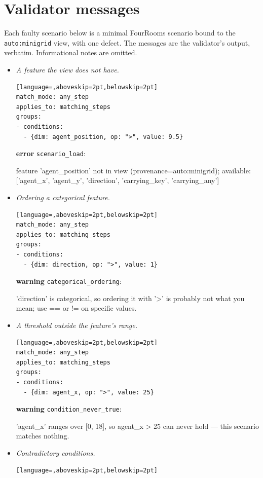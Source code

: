 \section{Validator messages}
\label{app:validator}

Each faulty scenario below is a minimal FourRooms scenario bound to the \texttt{auto:minigrid} view, with one defect. The messages are the validator's output, verbatim. Informational notes are omitted.

\begin{itemize}\setlength{\itemsep}{3pt}
\item \emph{A feature the view does not have.}
\begin{lstlisting}[language=,aboveskip=2pt,belowskip=2pt]
match_mode: any_step
applies_to: matching_steps
groups:
- conditions:
  - {dim: agent_position, op: ">", value: 9.5}
\end{lstlisting}
\textbf{error} \texttt{scenario\_load}:\\{\raggedright\footnotesize\ttfamily feature 'agent\_position' not in view (provenance=auto:minigrid); available: ['agent\_x', 'agent\_y', 'direction', 'carrying\_key', 'carrying\_any']\par}
\item \emph{Ordering a categorical feature.}
\begin{lstlisting}[language=,aboveskip=2pt,belowskip=2pt]
match_mode: any_step
applies_to: matching_steps
groups:
- conditions:
  - {dim: direction, op: ">", value: 1}
\end{lstlisting}
\textbf{warning} \texttt{categorical\_ordering}:\\{\raggedright\footnotesize\ttfamily 'direction' is categorical, so ordering it with '>' is probably not what you mean; use == or != on specific values.\par}
\item \emph{A threshold outside the feature's range.}
\begin{lstlisting}[language=,aboveskip=2pt,belowskip=2pt]
match_mode: any_step
applies_to: matching_steps
groups:
- conditions:
  - {dim: agent_x, op: ">", value: 25}
\end{lstlisting}
\textbf{warning} \texttt{condition\_never\_true}:\\{\raggedright\footnotesize\ttfamily 'agent\_x' ranges over [0, 18], so agent\_x > 25 can never hold — this scenario matches nothing.\par}
\item \emph{Contradictory conditions.}
\begin{lstlisting}[language=,aboveskip=2pt,belowskip=2pt]

\end{lstlisting}
\end{itemize}
